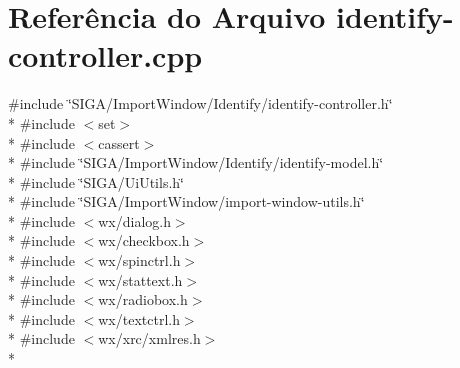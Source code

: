 \section{Referência do Arquivo identify-\/controller.cpp}
\label{identify-controller_8cpp}
{\ttfamily \#include \char`\"{}S\+I\+G\+A/\+Import\+Window/\+Identify/identify-\/controller.\+h\char`\"{}}\\*
{\ttfamily \#include $<$set$>$}\\*
{\ttfamily \#include $<$cassert$>$}\\*
{\ttfamily \#include \char`\"{}S\+I\+G\+A/\+Import\+Window/\+Identify/identify-\/model.\+h\char`\"{}}\\*
{\ttfamily \#include \char`\"{}S\+I\+G\+A/\+Ui\+Utils.\+h\char`\"{}}\\*
{\ttfamily \#include \char`\"{}S\+I\+G\+A/\+Import\+Window/import-\/window-\/utils.\+h\char`\"{}}\\*
{\ttfamily \#include $<$wx/dialog.\+h$>$}\\*
{\ttfamily \#include $<$wx/checkbox.\+h$>$}\\*
{\ttfamily \#include $<$wx/spinctrl.\+h$>$}\\*
{\ttfamily \#include $<$wx/stattext.\+h$>$}\\*
{\ttfamily \#include $<$wx/radiobox.\+h$>$}\\*
{\ttfamily \#include $<$wx/textctrl.\+h$>$}\\*
{\ttfamily \#include $<$wx/xrc/xmlres.\+h$>$}\\*
